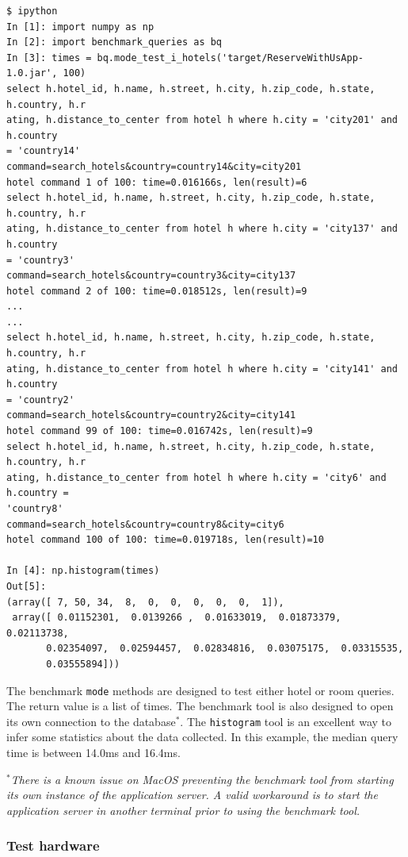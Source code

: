 \documentclass[letterpaper]{article}%
\begin{document}
\begin{Verbatim}
$ ipython
In [1]: import numpy as np
In [2]: import benchmark_queries as bq
In [3]: times = bq.mode_test_i_hotels('target/ReserveWithUsApp-1.0.jar', 100)
select h.hotel_id, h.name, h.street, h.city, h.zip_code, h.state, h.country, h.r
ating, h.distance_to_center from hotel h where h.city = 'city201' and h.country 
= 'country14'
command=search_hotels&country=country14&city=city201
hotel command 1 of 100: time=0.016166s, len(result)=6
select h.hotel_id, h.name, h.street, h.city, h.zip_code, h.state, h.country, h.r
ating, h.distance_to_center from hotel h where h.city = 'city137' and h.country 
= 'country3'
command=search_hotels&country=country3&city=city137
hotel command 2 of 100: time=0.018512s, len(result)=9
...
...
select h.hotel_id, h.name, h.street, h.city, h.zip_code, h.state, h.country, h.r
ating, h.distance_to_center from hotel h where h.city = 'city141' and h.country 
= 'country2'
command=search_hotels&country=country2&city=city141
hotel command 99 of 100: time=0.016742s, len(result)=9
select h.hotel_id, h.name, h.street, h.city, h.zip_code, h.state, h.country, h.r
ating, h.distance_to_center from hotel h where h.city = 'city6' and h.country = 
'country8'
command=search_hotels&country=country8&city=city6
hotel command 100 of 100: time=0.019718s, len(result)=10

In [4]: np.histogram(times)
Out[5]:
(array([ 7, 50, 34,  8,  0,  0,  0,  0,  0,  1]),
 array([ 0.01152301,  0.0139266 ,  0.01633019,  0.01873379,  0.02113738,
       0.02354097,  0.02594457,  0.02834816,  0.03075175,  0.03315535,
       0.03555894]))
\end{Verbatim}

The benchmark \texttt{mode} methods are designed to test either hotel or room
queries. The return value is a list of times. The benchmark tool is also
designed to open its own connection to the database$^*$. The \texttt{histogram}
tool is an excellent way to infer some statistics about the data collected. In
this example, the median query time is between 14.0ms and 16.4ms.

\vspace{1em}
{\small
\textsl{$^*$There is a known issue on MacOS preventing the benchmark tool from
starting its own instance of the application server.  A valid workaround is to
start the application server in another terminal prior to using the benchmark
tool.}
}

\subsubsection{Test hardware}
\end{document}
